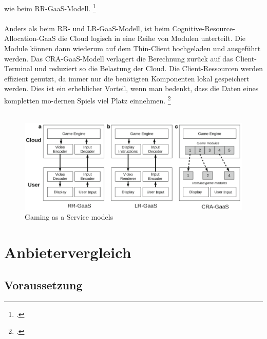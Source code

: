 \documentclass[12pt,toc=bib,toc=listof]{scrreprt}
\begin{document}
wie beim RR-GaaS-Modell. \footcite [Vgl.] [] {Cai.2014}
\\ \\
Anders als beim RR- und LR-GaaS-Modell, ist beim Cognitive-Resource-Allocation-GaaS die Cloud logisch in eine Reihe von Modulen unterteilt. Die Module können dann wiederum auf dem Thin-Client 
hochgeladen und ausgeführt werden. Das CRA-GaaS-Modell verlagert die Berechnung zurück auf das Client-Terminal und reduziert so die Belastung der Cloud. Die Client-Ressourcen werden effizient 
genutzt, da immer nur die benötigten Komponenten lokal gespeichert werden. Dies ist ein erheblicher Vorteil, wenn man bedenkt, dass die Daten eines kompletten mo-dernen Spiels viel Platz einnehmen.
\footcite [Vgl.] [] {Dangelo.2015}
\\ \\
\begin{figure}[h]
  \centering
  \includegraphics[scale=0.9]{Abbildungen/GaaS_1.png} 
  \caption[D’Angelo, Ferretti and Marzolla (2022)]{Gaming as a Service models}
\end{figure}

\section{Anbietervergleich}
\label{sec:Anbietervergleich}


\subsection{Voraussetzung}
\label{sec:Vorraussetzung}
\end{document}
